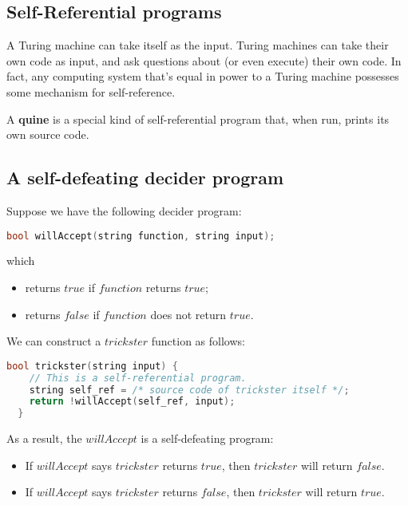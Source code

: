 \documentclass[12pt, letterpaper, oneside]{book}
\begin{document}
\subsection{Self-Referential programs}

A Turing machine can take itself as the input. Turing machines can take their own code as input, and ask questions
about (or even execute) their own code. In fact, any computing system that's equal in power to a Turing machine possesses some mechanism for self-reference.

A \textbf{quine} is a special kind of self-referential program that, when run, prints its own source code.

\subsection{A self-defeating decider program}

Suppose we have the following decider program:

\begin{lstlisting}[language=C++]
  bool willAccept(string function, string input);
\end{lstlisting}

which
\begin{itemize}
  \item returns $true$ if $function$ returns $true$;
  \item returns $false$ if $function$ does not return $true$.
\end{itemize}

We can construct a $trickster$ function as follows:

\begin{lstlisting}[language=C++]
  bool trickster(string input) {
    // This is a self-referential program.
    string self_ref = /* source code of trickster itself */;
    return !willAccept(self_ref, input);
  }
\end{lstlisting}

As a result, the $willAccept$ is a self-defeating program:
\begin{itemize}
  \item If $willAccept$ says $trickster$ returns $true$, then $trickster$ will return $false$.
  \item If $willAccept$ says $trickster$ returns $false$, then $trickster$ will return $true$.
\end{itemize}
\end{document}

